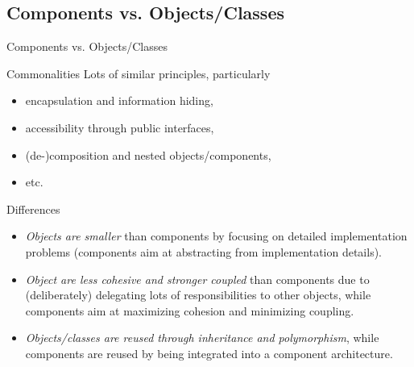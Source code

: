 \subsection{Components vs. Objects/Classes}
\begin{frame}{Components vs. Objects/Classes}
	\begin{mycolumns}[widths={40,60},animation=none]
		\begin{note}{Commonalities}	
			Lots of similar principles, particularly 
			\begin{itemize}
				\item encapsulation and information hiding,  
				\item accessibility through public interfaces,
				\item (de-)composition and nested objects/components,
				\item etc.				
			\end{itemize}
		\end{note}
		\pause
	\mynextcolumn
		\begin{note}{Differences}
			\begin{itemize}
				\item \emph{Objects are smaller} than components by focusing on detailed implementation problems (components aim at abstracting from implementation details).
				\item \emph{Object are less cohesive and stronger coupled} than components due to (deliberately) delegating lots of responsibilities to other objects, while components aim at maximizing cohesion and minimizing coupling.
				\item \emph{Objects/classes are reused through inheritance and polymorphism}, while components are reused by being integrated into a component architecture.		
			\end{itemize}			
		\end{note}
	\end{mycolumns}	
\end{frame}

